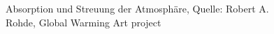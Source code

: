 \begin{frame}
\begin{figure}
{    }
  	\caption{Absorption und Streuung der Atmosphäre, Quelle: Robert A. Rohde, Global Warming Art project}
  \end{figure}


\end{frame}
